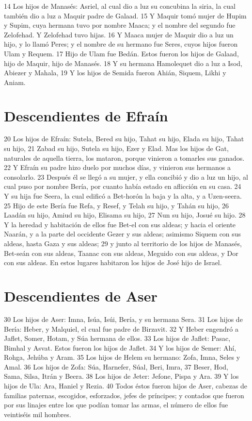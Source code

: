 14 Los hijos de Manasés: Asriel, al cual dio a luz su concubina la siria, la cual también dio a luz a Maquir padre de Galaad.
15 Y Maquir tomó mujer de Hupim y Supim, cuya hermana tuvo por nombre Maaca; y el nombre del segundo fue Zelofehad. Y Zelofehad tuvo hijas.
16 Y Maaca mujer de Maquir dio a luz un hijo, y lo llamó Peres; y el nombre de su hermano fue Seres, cuyos hijos fueron Ulam y Requem. 
17 Hijo de Ulam fue Bedán. Estos fueron los hijos de Galaad, hijo de Maquir, hijo de Manasés.
18 Y su hermana Hamolequet dio a luz a Isod, Abiezer y Mahala,
19 Y los hijos de Semida fueron Ahián, Siquem, Likhi y Aniam.
\section*{Descendientes de Efraín}

20 Los hijos de Efraín: Sutela, Bered su hijo, Tahat su hijo, Elada su hijo, Tahat su hijo,
21 Zabad su hijo, Sutela su hijo, Ezer y Elad. Mas los hijos de Gat, naturales de aquella tierra, los mataron, porque vinieron a tomarles sus ganados.
22 Y Efraín su padre hizo duelo por muchos días, y vinieron sus hermanos a consolarlo.
23 Después él se llegó a su mujer, y ella concibió y dio a luz un hijo, al cual puso por nombre Bería, por cuanto había estado en aflicción en su casa.
24 Y su hija fue Seera, la cual edificó a Bet-horón la baja y la alta, y a Uzen-seera.
25 Hijo de este Bería fue Refa, y Resef, y Telah su hijo, y Tahán su hijo,
26 Laadán su hijo, Amiud su hijo, Elisama su hijo,
27 Nun su hijo, Josué su hijo.
28 Y la heredad y habitación de ellos fue Bet-el con sus aldeas; y hacia el oriente Naarán, y a la parte del occidente Gezer y sus aldeas; asimismo Siquem con sus aldeas, hasta Gaza y sus aldeas;
29 y junto al territorio de los hijos de Manasés, Bet-seán con sus aldeas, Taanac con sus aldeas, Meguido con sus aldeas, y Dor con sus aldeas. En estos lugares habitaron los hijos de José hijo de Israel.
\section*{Descendientes de Aser}

30 Los hijos de Aser: Imna, Isúa, Isúi, Bería, y su hermana Sera.
31 Los hijos de Bería: Heber, y Malquiel, el cual fue padre de Birzavit.
32 Y Heber engendró a Jaflet, Somer, Hotam, y Súa hermana de ellos.
33 Los hijos de Jaflet: Pasac, Bimhal y Asvat. Estos fueron los hijos de Jaflet.
34 Y los hijos de Semer: Ahí, Rohga, Jehúba y Aram.
35 Los hijos de Helem su hermano: Zofa, Imna, Seles y Amal.
36 Los hijos de Zofa: Súa, Harnefer, Súal, Beri, Imra,
37 Beser, Hod, Sama, Silsa, Itrán y Beera.
38 Los hijos de Jeter: Jefone, Pispa y Ara.
39 Y los hijos de Ula: Ara, Haniel y Rezia.
40 Todos éstos fueron hijos de Aser, cabezas de familias paternas, escogidos, esforzados, jefes de príncipes; y contados que fueron por sus linajes entre los que podían tomar las armas, el número de ellos fue veintiséis mil hombres.


